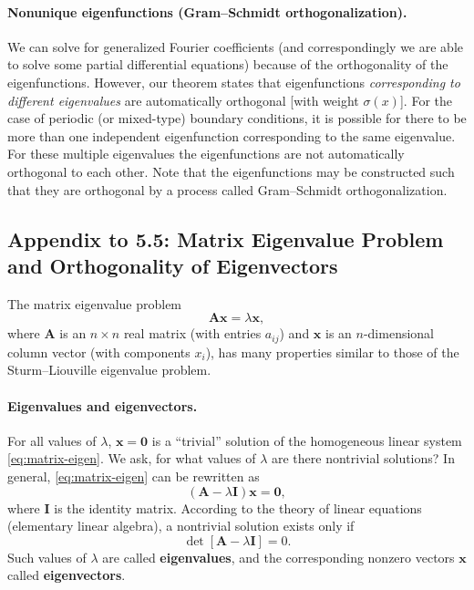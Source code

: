 \paragraph{Nonunique eigenfunctions (Gram--Schmidt orthogonalization).}
We can solve for generalized Fourier coefficients (and correspondingly we are able to solve some partial differential equations) because of the orthogonality of the eigenfunctions.  However, our theorem states that eigenfunctions \textit{corresponding to different eigenvalues} are automatically orthogonal [with weight $\sigma(x)$].  For the case of periodic (or mixed-type) boundary conditions, it is possible for there to be more than one independent eigenfunction corresponding to the same eigenvalue.  For these multiple eigenvalues the eigenfunctions are not automatically orthogonal to each other.  Note that the eigenfunctions may be constructed such that they are orthogonal by a process called Gram--Schmidt orthogonalization.

\subsection*{Appendix to 5.5: Matrix Eigenvalue Problem and Orthogonality of Eigenvectors}

The matrix eigenvalue problem
\begin{equation}
\label{eq:matrix-eigen}
\bm{A}\bm{x} = \lambda\bm{x},
\end{equation}
where $\bm{A}$ is an $n \times n$ real matrix (with entries $a_{ij}$) and $\bm{x}$ is an $n$-dimensional column vector (with components $x_i$), has many properties similar to those of the Sturm--Liouville eigenvalue problem.

\paragraph{Eigenvalues and eigenvectors.}
For all values of $\lambda$, $\bm{x} = \bm{0}$ is a ``trivial'' solution of the homogeneous linear system \eqref{eq:matrix-eigen}.  We ask, for what values of $\lambda$ are there nontrivial solutions?  In general, \eqref{eq:matrix-eigen} can be rewritten as
\begin{equation}
\label{eq:matrix-char}
(\bm{A} - \lambda\bm{I})\bm{x} = \bm{0},
\end{equation}
where $\bm{I}$ is the identity matrix.  According to the theory of linear equations (elementary linear algebra), a nontrivial solution exists only if
\begin{equation}
\label{eq:char-poly}
\det[\bm{A} - \lambda\bm{I}] = 0.
\end{equation}
Such values of $\lambda$ are called \textbf{eigenvalues}, and the corresponding nonzero vectors $\bm{x}$ called \textbf{eigenvectors}.

